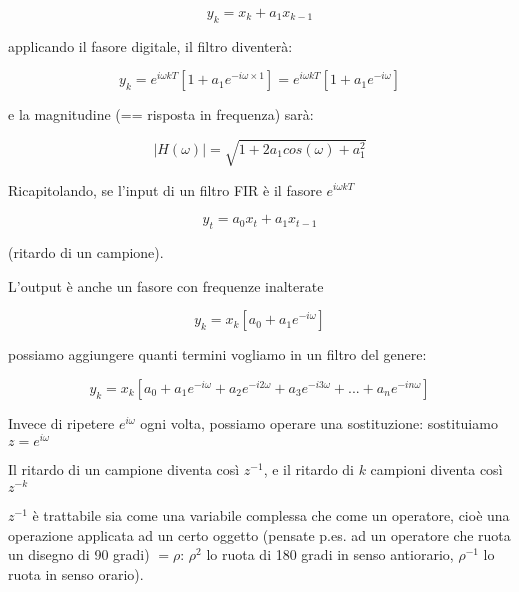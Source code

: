      \begin{equation}
       y_k = x_k + a_1 x_{k-1}
     \end{equation}

    applicando il fasore digitale, il filtro diventer\`a:

     \begin{equation}
        y_k = e^{i\omega kT} [ 1 + a_1 e^{-i\omega \times 1} ] = e^{i \omega kT} [ 1 + a_1 e^{-i \omega } ]
     \end{equation}

    e la magnitudine (== risposta in frequenza) sar\`a:

     \begin{equation}
       |H( \omega )| = \sqrt{1 + 2 a_1 cos( \omega ) + a_1^2}
     \end{equation}

  Ricapitolando, se l'input di un filtro FIR \`e il fasore $e^{i \omega kT}$

     \begin{equation}
     y_t = a_0 x_t + a_1 x_{t-1}
     \end{equation}

    (ritardo di un campione).

    L'output \`e anche un fasore con frequenze inalterate

     \begin{equation}
     y_k = x_k \left [ a_0 + a_1 e^{-i \omega} \right ]
     \end{equation}

    possiamo aggiungere quanti termini vogliamo in un filtro del genere:

     \begin{equation}
     y_k = x_k \left [ a_0 + a_1 e^{-i\omega } + a_2 e^{-i2\omega } + a_3 e^{-i3\omega } + ... + a_n e^{-in\omega } \right ]
     \end{equation}


  Invece di ripetere $e^{i\omega}$ ogni volta, possiamo operare una sostituzione: sostituiamo $z = e^{i \omega}$

  Il ritardo di un campione diventa cos\`i $z^{-1}$, e il ritardo di $k$ campioni
    diventa cos\`i $z^{-k}$

  $z^{-1}$ \`e trattabile sia come una variabile complessa che come un
    operatore, cio\`e una operazione applicata ad un certo oggetto (pensate
    p.es. ad un operatore che ruota un disegno di 90 gradi) $= \rho$: $\rho^2$ lo
    ruota di 180 gradi in senso antiorario, $\rho^{-1}$ lo ruota in senso orario).

